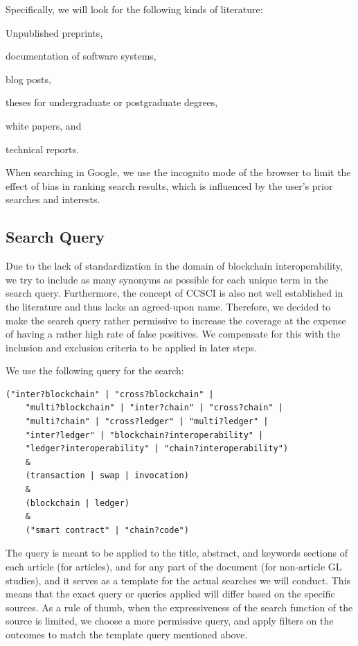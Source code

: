 \documentclass[review]{elsarticle}
\begin{document}
Specifically, we will look for the following kinds of literature:
\begin{inparaenum}[(i)]
	\item Unpublished preprints,
	\item documentation of software systems,
	\item blog posts,
	\item theses for undergraduate or postgraduate degrees,
	\item white papers, and
	\item technical reports.
\end{inparaenum}
When searching in Google, we use the incognito mode of the browser to limit the effect of bias in ranking search results, which is influenced by the user's prior searches and interests.


\subsection{Search Query}
Due to the lack of standardization in the domain of blockchain interoperability, we try to include as many synonyms as possible for each unique term in the search query.
Furthermore, the concept of CCSCI is also not well established in the literature and thus lacks an agreed-upon name.
Therefore, we decided to make the search query rather permissive to increase the coverage at the expense of having a rather high rate of false positives.
We compensate for this with the inclusion and exclusion criteria to be applied in later steps.

We use the following query for the search:
\begin{lstlisting}[caption={The query term used to search for primary and secondary studies.},label={lst:query-string}]
	("inter?blockchain" | "cross?blockchain" | 
	"multi?blockchain" | "inter?chain" | "cross?chain" |
	"multi?chain" | "cross?ledger" | "multi?ledger" | 
	"inter?ledger" | "blockchain?interoperability" | 
	"ledger?interoperability" | "chain?interoperability") 
	& 
	(transaction | swap | invocation)
	&
	(blockchain | ledger)
	&
	("smart contract" | "chain?code")
\end{lstlisting}
The query is meant to be applied to the title, abstract, and keywords sections of each article (for articles), and for any part of the document (for non-article GL studies), and it serves as a template for the actual searches we will conduct.
This means that the exact query or queries applied will differ based on the specific sources.
As a rule of thumb, when the expressiveness of the search function of the source is limited, we choose a more permissive query, and apply filters on the outcomes to match the template query mentioned above.
\end{document}

